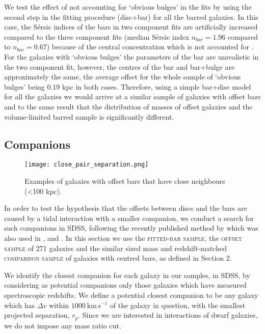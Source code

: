 \documentclass[a4paper,fleqn,usenatbib,useAMS]{mnras}
\begin{document}
We test the effect of not accounting for `obvious bulges' in the fits by using the second step in the fitting procedure (disc+bar) for all the barred galaxies. In this case, the S\'ersic indices of the bars in two component fits are artificially increased compared to the three component fits (median S\'ersic index $n_{bar}=1.96$ compared to $n_{bar}=0.67$) because of the central concentration which is not accounted for \citep{Peng2010}. For the galaxies with `obvious bulges' the parameters of the bar are unrealistic in the two component fit, however, the centres of the bar and bar+bulge are approximately the same, the average offset for the whole sample of `obvious bulges' being 0.19 kpc in both cases. Therefore, using a simple bar+disc model for all the galaxies we would arrive at a similar sample of galaxies with offset bars and to the same result that the distribution of masses of offset galaxies and the volume-limited barred sample is significantly different. 

\subsection{Companions}

\begin{figure}
 \texttt{[image: close\_pair\_separation.png]}
 \caption{Examples of galaxies with offset bars that have close neighbours (<100 kpc).}
 \label{pair}
\end{figure}

In order to test the hypothesis that the offsets between discs and the bars are caused by a tidal interaction with a smaller companion, we conduct a search for such companions in SDSS, following the recently published method by \citet{Patton2016} which was also used in \citet{Barton2000}, \citet{Ellison2008} and \citet{Patton2011}. In this section we use the \textsc{fitted-bar sample}, the \textsc{offset sample} of 271 galaxies and the similar sized mass and redshift-matched \textsc{comparison sample} of galaxies with centred bars, as defined in Section 2.

We identify the closest companion for each galaxy in our samples, in SDSS, by considering as potential companions only those galaxies which have measured spectroscopic redshifts. We define a potential closest companion to be any galaxy which has $\Delta v$ within $1000 \:\mathrm{km\,s^{-1}}$ of the galaxy in question, with the smallest projected separation, $r_{p}$. Since we are interested in interactions of dwarf galaxies, we do not impose any mass ratio cut. 
\end{document}
